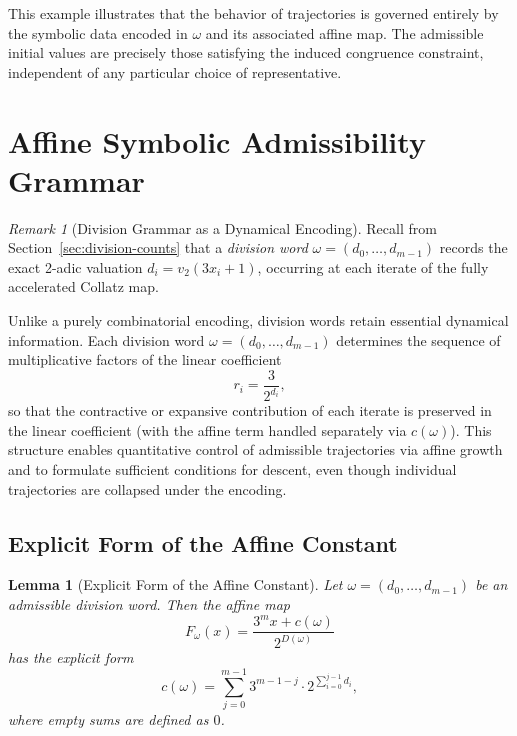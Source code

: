 \documentclass[12pt, oneside]{article}
\numberwithin{equation}{section}
\theoremstyle{definition}
\theoremstyle{plain}
\newtheorem{lemma}[theorem]{Lemma}
\theoremstyle{remark}
\newtheorem*{remark}{Remark}
\begin{document}
\medskip

This example illustrates that the behavior of trajectories is governed
entirely by the symbolic data encoded in $\omega$ and its associated
affine map. The admissible initial values are precisely those satisfying
the induced congruence constraint, independent of any particular choice
of representative.

\section{Affine Symbolic Admissibility Grammar}

\begin{remark}[Division Grammar as a Dynamical Encoding]
Recall from Section~\ref{sec:division-counts} that a \emph{division word}
$\omega=(d_0,\dots,d_{m-1})$ records the exact 2-adic valuation
$d_i = v_2(3 x_i + 1)$, occurring at each iterate of the fully accelerated
Collatz map.

Unlike a purely combinatorial encoding, division words retain essential
dynamical information. Each division word $\omega=(d_0,\dots,d_{m-1})$
determines the sequence of multiplicative factors of the linear coefficient
\[
r_i = \frac{3}{2^{d_i}},
\]
so that the contractive or expansive contribution of each iterate is
preserved in the linear coefficient (with the affine term handled separately
via $c(\omega)$). This structure enables quantitative control of admissible
trajectories via affine growth and to formulate sufficient conditions for
descent, even though individual trajectories are collapsed under the encoding.
\end{remark}

\subsection{Explicit Form of the Affine Constant}
\begin{lemma}[Explicit Form of the Affine Constant]
Let $\omega = (d_0,\dots,d_{m-1})$ be an admissible division word.  
Then the affine map
\[
F_\omega(x) = \frac{3^m x + c(\omega)}{2^{D(\omega)}}
\]
has the explicit form
\[
c(\omega)
=
\sum_{j=0}^{m-1}
3^{m-1-j}\cdot 2^{\sum_{i=0}^{j-1} d_i},
\]
where empty sums are defined as $0$.
\end{lemma}
\end{document}
